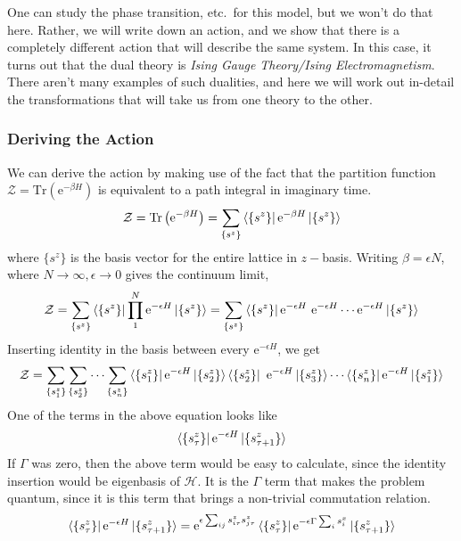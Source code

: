 \documentclass[11pt]{article}
\newcommand{\e}{\mathrm{e}}
\newcommand{\hd}{\mathcal{H}}
\numberwithin{equation}{section}
\begin{document}
One can study the phase transition, etc.\ for this model, but we won't do that here. Rather, we will write down an action, and we show that there is a completely different action that will describe the same system. In this case, it turns out that the dual theory is \textit{Ising Gauge Theory/Ising Electromagnetism}. There aren't many examples of such dualities, and here we will work out in-detail the transformations that will take us from one theory to the other.

\subsubsection{Deriving the Action}
We can derive the action by making use of the fact that the partition function \(\mathcal{Z} = \mathrm{Tr}\left( \e^{-\beta H} \right)\) is equivalent to a path integral in imaginary time. 
\begin{equation*}
    \mathcal{Z} = \mathrm{Tr}\left( \e^{-\beta H} \right) = \sum_{\{s^z\}} \bra{\{s^z\}} \e^{-\beta H} \ket{\{s^z\}}
\end{equation*}
where \(\{s^z\}\) is the basis vector for the entire lattice in \(z-\)basis. Writing \(\beta = \epsilon N\), where \(N\to \infty, \epsilon\to 0\) gives the continuum limit, 
\begin{equation*}
    \mathcal{Z} =  \sum_{\{s^z\}} \bra{\{s^z\}} \prod_{1}^{N}\e^{-\epsilon H} \ket{\{s^z\}} = \sum_{\{s^z\}} \bra{\{s^z\}}\e^{-\epsilon H} ~\e^{-\epsilon H}\cdots \e^{-\epsilon H}\ket{\{s^z\}}
\end{equation*}
Inserting identity in the basis between every \(\e^{-\epsilon H}\), we get 
\begin{align*}
    \mathcal{Z} =  \sum_{\{s_1^z\}}\sum_{\{s_2^z\}}\cdots\sum_{\{s_{n}^z\}}  \bra{\{s_1^z\}}\e^{-\epsilon H} \ket{\{s_2^z\}}\bra{\{s_2^z\}} ~\e^{-\epsilon H} \ket{\{s_3^z\}}\cdots \bra{\{s_{n}^z\}}\e^{-\epsilon H}\ket{\{s_1^z\}}
\end{align*}
One of the terms in the above equation looks like 
\begin{equation*}
    \bra{\{s_\tau^z\}} \e^{-\epsilon H} \ket{\{s_{\tau+1}^z\}}
\end{equation*}
If \(\Gamma\) was zero, then the above term would be easy to calculate, since the identity insertion would be eigenbasis of \(\hd\). It is the \(\Gamma\) term that makes the problem quantum, since it is this term that brings a non-trivial commutation relation.
\begin{equation*}
    \bra{\{s_\tau^z\}} \e^{-\epsilon H} \ket{\{s_{\tau+1}^z\}} = \e^{\epsilon \sum_{ij} s^z_{i\tau}s^z_{j\tau}}\bra{\{s_\tau^z\}} \e^{-\epsilon \Gamma\sum_i s^x_i} \ket{\{s_{\tau+1}^z\}}
\end{equation*}
\end{document}
